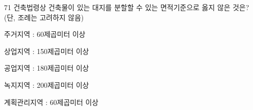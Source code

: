 \begin{question}{71}
건축법령상 건축물이 있는 대지를 분할할 수 있는 면적기준으로 옳지 않은 것은? (단, 조례는 고려하지 않음)
\begin{choices}
  \item 주거지역 : 60제곱미터 이상
  \item 상업지역 : 150제곱미터 이상
  \item 공업지역 : 180제곱미터 이상
  \item 녹지지역 : 200제곱미터 이상
  \item 계획관리지역 : 60제곱미터 이상
\end{choices}
\end{question}
